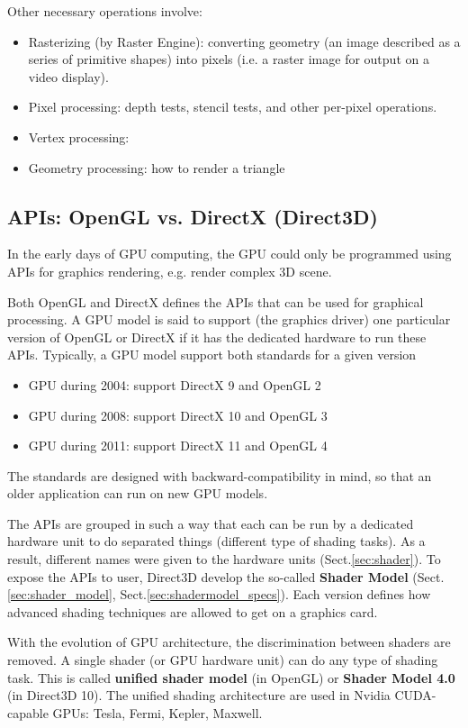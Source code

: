 Other necessary operations involve:
\begin{itemize}
\item Rasterizing (by Raster Engine): converting geometry (an image
  described as a series of primitive shapes) into pixels (i.e. a
  raster image for output on a video display).
\item Pixel processing: depth tests, stencil tests, and other
  per-pixel operations.
\item Vertex processing:
\item Geometry processing: how to render a triangle
\end{itemize}

\subsection{APIs: OpenGL vs. DirectX (Direct3D)}

In the early days of GPU computing, the GPU could only be programmed using APIs
for graphics rendering, e.g. render complex 3D scene.

Both OpenGL and DirectX defines the APIs that can be used for graphical
processing. A GPU model is said to support (the graphics driver) one particular
version of OpenGL or DirectX if it has the dedicated hardware to run these APIs.
Typically, a GPU model support both standards for a given version
\begin{itemize}
  \item GPU during 2004: support DirectX 9 and OpenGL 2
  \item GPU during 2008: support DirectX 10 and OpenGL 3
  \item GPU during 2011: support DirectX 11 and OpenGL 4
\end{itemize}
The standards are designed with backward-compatibility in mind, so that an older
application can run on new GPU models.

The APIs are grouped in such a way that each can be run by a dedicated hardware
unit to do separated things (different type of shading tasks). As a result,
different names were given to the hardware units (Sect.\ref{sec:shader}). To
expose the APIs to user, Direct3D develop the so-called {\bf Shader Model}
(Sect.\ref{sec:shader_model}, Sect.\ref{sec:shadermodel_specs}). Each version
defines how advanced shading techniques are allowed to get on a graphics card.

With the evolution of GPU architecture, the discrimination between shaders are
removed. A single shader (or GPU hardware unit) can do any type of shading task.
This is called {\bf unified shader model} (in OpenGL) or {\bf Shader Model 4.0}
(in Direct3D 10). The unified shading architecture are used in Nvidia
CUDA-capable GPUs: Tesla, Fermi, Kepler, Maxwell. 


